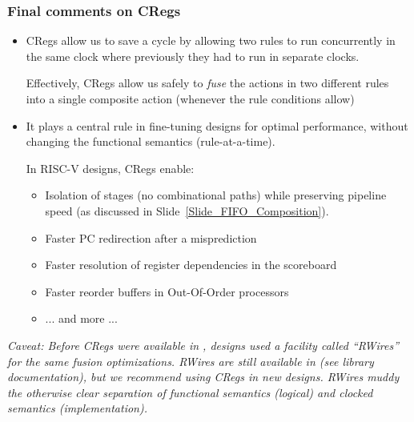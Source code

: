 \begin{frame}[fragile]
\frametitle{Final comments on CRegs}

\footnotesize

\begin{itemize}

 \item CRegs allow us to save a cycle by allowing two rules to run
       concurrently in the same clock where previously they had to run
       in separate clocks.

       \vspace{1ex}

       Effectively, CRegs allow us safely to \emph{fuse} the actions
       in two different rules into a single composite action (whenever
       the rule conditions allow)

 \item It plays a central rule in fine-tuning {\BSV} designs for
       optimal performance, without changing the functional semantics
       (rule-at-a-time).

       \vspace{1ex}

       In RISC-V designs, CRegs enable:
       \begin{itemize}\footnotesize

         \item Isolation of stages (no combinational paths) while
               preserving pipeline speed (as discussed in
               Slide~\ref{Slide_FIFO_Composition}).

         \item Faster PC redirection after a misprediction
         \item Faster resolution of register dependencies in the scoreboard
         \item Faster reorder buffers in Out-Of-Order processors
         \item ... and more ...
       \end{itemize}

\end{itemize}

\PAUSE{\vspace*{5ex}}

 \emph{Caveat: Before CRegs were available in {\BSV}, designs used a
       facility called ``RWires'' for the same fusion optimizations.
       RWires are still available in {\BSV} (see library documentation),
       but we recommend using CRegs in new designs.  RWires muddy the
       otherwise clear separation of functional semantics (logical)
       and clocked semantics (implementation).}

\end{frame}








